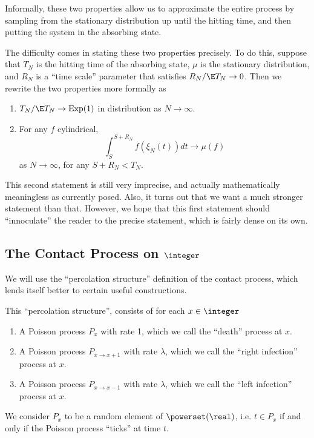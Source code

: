 \documentclass{scrartcl}
\DeclareMathOperator{\expDist}{Exp}
\begin{document}
Informally, these two properties allow us to approximate the entire process by sampling from the stationary distribution up until the hitting time, and then putting the system in the absorbing state.

The difficulty comes in stating these two properties precisely. To do this, suppose that $T_{N}$ is the hitting time of the absorbing state, $\mu$ is the stationary distribution, 
and $R_{N}$ is a ``time scale'' parameter that satisfies $R_{N}/\E T_{N} \to 0$. Then we rewrite the two properties more formally as

\begin{enumerate}
  \item $T_{N} / \E T_{N} \to \expDist(1)$ in distribution as $N \to \infty$.
  \item For any $f$ cylindrical,
    \[ \int_{S}^{S + R_{N}} f(\xi_{N}(t)) dt \to \mu(f) \]
    as $N \to \infty$, for any $S + R_{N} < T_{N}$.
\end{enumerate}

This second statement is still very imprecise, and actually mathematically meaningless as currently posed. Also, it turns out that we want a much stronger statement than that. However, we hope that this first statement should ``innoculate'' the reader to the precise statement, which is fairly dense on its own.

\subsection{The Contact Process on $\integer$}

We will use the ``percolation structure'' definition of the contact process, which lends itself better to certain useful constructions.

This ``percolation structure'', consists of for each $x \in \integer$
\begin{enumerate}
  \item A Poisson process $P_{x}$ with rate 1, which we call the ``death'' process at $x$.
  \item A Poisson process $P_{x \to x+1}$ with rate $\lambda$, which we call the ``right infection'' process at $x$.
  \item A Poisson process $P_{x \to x-1}$ with rate $\lambda$, which we call the ``left infection'' process at $x$.
\end{enumerate}

We consider $P_{x}$ to be a random element of $\powerset(\real)$, i.e. $t \in P_{x}$ if and only if the Poisson process ``ticks'' at time $t$.
\end{document}
